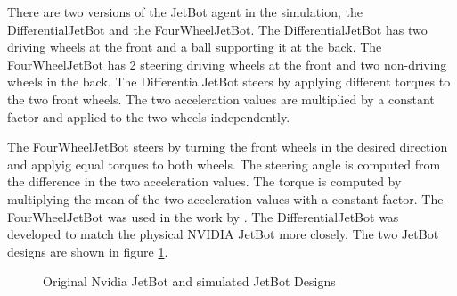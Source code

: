 There are two versions of the JetBot agent in the simulation, the DifferentialJetBot and the FourWheelJetBot. The DifferentialJetBot has two driving wheels at the front and a ball supporting it at the back. The FourWheelJetBot has 2 steering driving wheels at the front and two non-driving wheels in the back. The DifferentialJetBot steers by applying different torques to the two front wheels. The two acceleration values are multiplied by a constant factor and applied to the two wheels independently.

The FourWheelJetBot steers by turning the front wheels in the desired direction and applyig equal torques to both wheels. The steering angle is computed from the difference in the two acceleration values. The torque is computed by multiplying the mean of the two acceleration values with a constant factor.
The FourWheelJetBot was used in the work by \autocite{maximilian}. The DifferentialJetBot was developed to match the physical NVIDIA JetBot more closely. The two JetBot designs are shown in figure \ref{fig:jetbots}.


\begin{figure}
    \centering
    \qquad
    \qquad
    \qquad
    \caption{Original Nvidia JetBot and simulated JetBot Designs}
    \label{fig:jetbots}
\end{figure} %


